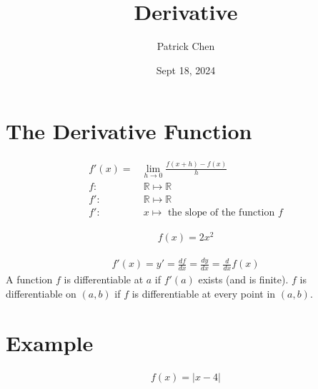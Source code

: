 \documentclass{article}
\title{Derivative}
\author{Patrick Chen}
\date{Sept 18, 2024}
\theoremstyle{mytheoremstyle}
\theoremstyle{mytheoremstyle}
\theoremstyle{myproblemstyle}
\begin{document}
    \maketitle
    \section*{The Derivative Function}
    \begin{align*}
        f'(x) =& \lim_{h\to 0} \frac{f(x+h)-f(x)}{h} \\
        f:&\ \mathbb{R} \mapsto \mathbb{R} \\
        f':&\ \mathbb{R} \mapsto \mathbb{R} \\
        f':&\ x \mapsto \text{ the slope of the function } f
    \end{align*}

    \begin{align*}
        f(x) = 2x^2
    \end{align*}


    \begin{align*}
        f'(x)=y'= \frac{df}{dx} = \frac{dy}{dx} = \frac{d}{dx} f(x)
    \end{align*}
    A function $f$ is differentiable at $a$ if $f'(a)$ exists (and is finite).
    $f$ is differentiable on $(a,b)$ if $f$ is differentiable at every point in
    $(a,b)$.

    \section*{Example}
    \begin{align*}
        f(x) = |x-4|
    \end{align*}

\end{document}

